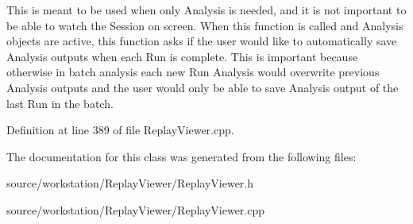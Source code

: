 This is meant to be used when only Analysis is needed, and it is not important to be able to watch the Session on screen. When this function is called and Analysis objects are active, this function asks if the user would like to automatically save Analysis outputs when each Run is complete. This is important because otherwise in batch analysis each new Run Analysis would overwrite previous Analysis outputs and the user would only be able to save Analysis output of the last Run in the batch. 

Definition at line 389 of file Replay\-Viewer.\-cpp.



The documentation for this class was generated from the following files\-:\begin{DoxyCompactItemize}
\item 
source/workstation/\-Replay\-Viewer/Replay\-Viewer.\-h\item 
source/workstation/\-Replay\-Viewer/Replay\-Viewer.\-cpp\end{DoxyCompactItemize}
